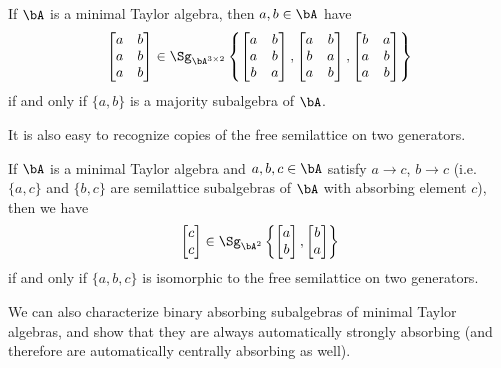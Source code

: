 \begin{prop} If $\bA$ is a minimal Taylor algebra, then $a, b \in \bA$ have
\[
\begin{bmatrix} a & b\\ a & b\\ a & b\end{bmatrix} \in \Sg_{\bA^{3\times 2}}\left\{\begin{bmatrix} a & b\\ a & b\\ b & a\end{bmatrix}, \begin{bmatrix} a & b\\ b & a\\ a & b\end{bmatrix}, \begin{bmatrix} b & a\\ a & b\\ a & b\end{bmatrix}\right\}
\]
if and only if $\{a,b\}$ is a majority subalgebra of $\bA$.
\end{prop}

It is also easy to recognize copies of the free semilattice on two generators.

\begin{prop} If $\bA$ is a minimal Taylor algebra and $a,b,c \in \bA$ satisfy $a \rightarrow c$, $b \rightarrow c$ (i.e. $\{a,c\}$ and $\{b,c\}$ are semilattice subalgebras of $\bA$ with absorbing element $c$), then we have
\[
\begin{bmatrix} c\\ c\end{bmatrix} \in \Sg_{\bA^2}\left\{\begin{bmatrix} a\\ b\end{bmatrix}, \begin{bmatrix} b\\ a\end{bmatrix}\right\}
\]
if and only if $\{a,b,c\}$ is isomorphic to the free semilattice on two generators.
\end{prop}

We can also characterize binary absorbing subalgebras of minimal Taylor algebras, and show that they are always automatically strongly absorbing (and therefore are automatically centrally absorbing as well).

